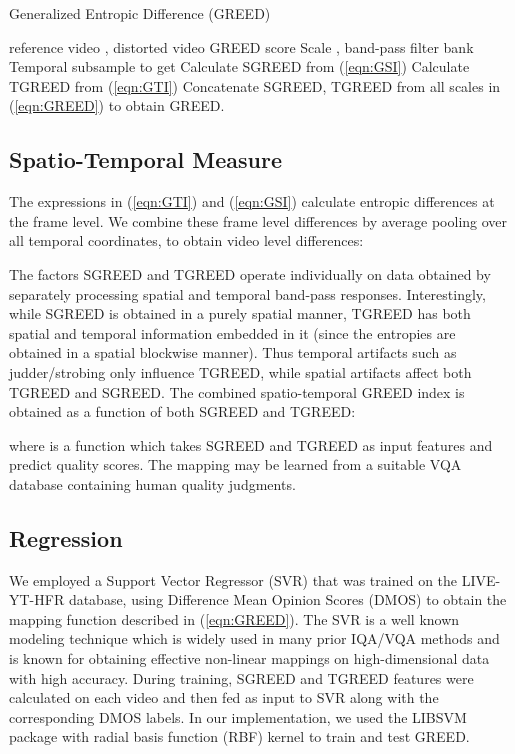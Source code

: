 \documentclass[journal]{IEEEtran}
\begin{document}
\begin{algorithm}[t] \caption{Generalized Entropic Difference (GREED)}
\begin{algorithmic}[1]
\Require reference video , distorted video 
\Ensure GREED score
\State Scale , band-pass filter bank 
\State Temporal subsample  to get 
\ForEach {}
\State Calculate SGREED from (\ref{eqn:GSI})
\ForEach {}
\State Calculate TGREED from (\ref{eqn:GTI})
\EndFor
\EndFor
\State Concatenate SGREED, TGREED from all scales in (\ref{eqn:GREED}) to obtain GREED.
\end{algorithmic}
\label{alg1}
\end{algorithm}

\subsection{Spatio-Temporal Measure}
The expressions in (\ref{eqn:GTI}) and (\ref{eqn:GSI}) calculate entropic differences at the frame level. We combine these frame level differences by average pooling over all temporal coordinates, to obtain video level differences:

The factors SGREED and TGREED operate individually on data obtained by separately processing spatial and temporal band-pass responses. Interestingly, while SGREED is obtained in a purely spatial manner, TGREED has both spatial and temporal information embedded in it (since the entropies are obtained in a spatial blockwise manner). Thus temporal artifacts such as judder/strobing only influence TGREED, while spatial artifacts affect both TGREED and SGREED. The combined spatio-temporal GREED index is obtained as a function of both SGREED and TGREED:

where  is a function which takes SGREED and TGREED as input features and predict quality scores. The mapping  may be learned from a suitable VQA database containing human quality judgments. 

\subsection{Regression}
We employed a Support Vector Regressor (SVR) \cite{scholkopf2000new} that was trained on the LIVE-YT-HFR database, using Difference Mean Opinion Scores (DMOS) to obtain the mapping function  described in (\ref{eqn:GREED}). The SVR is a well known modeling technique which is widely used in many prior IQA/VQA methods \cite{VMAF2016, bampis2018spatiotemporal, mittal2012no, saad2014blind} and is known for obtaining effective non-linear mappings on high-dimensional data with high accuracy. During training, SGREED and TGREED features were calculated on each video and then fed as input to SVR along with the corresponding DMOS labels. In our implementation, we used the LIBSVM \cite{chang2011libsvm} package with radial basis function (RBF) kernel to train and test GREED.
\end{document}
